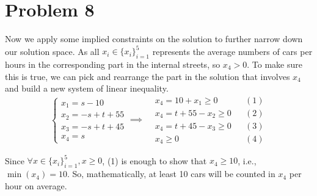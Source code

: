\documentclass[12pt,a4paper]{article}
\begin{document}
\section*{Problem 8}
\begin{solution}
Now we apply some implied constraints on the solution to further narrow down our solution space. As all $x_i \in \{x_i\}_{i=1}^5$ represents the average numbers of cars per hours in the corresponding part in the internal streets, so $x_4>0$. To make sure this is true, we can pick and rearrange the part in the solution that involves $x_4$ and build a new system of linear inequality.
\[
\begin{cases}
x_1 = s - 10 \\
x_2 = -s + t + 55 \\
x_3 = -s + t + 45 \\
x_4 = s
\end{cases}
\implies
\begin{aligned}
    &x_4 = 10 +x_1 \geq 0 && (1)\\
    &x_4 = t+55-x_2 \geq 0 && (2)\\
    &x_4 = t + 45 -x_3 \geq 0 && (3)\\
    &x_4 \geq 0 && (4)
\end{aligned}
\]

Since $\forall x\in \{x_i\}_{i=1}^5, x \geq 0$, (1) is enough to show that $x_4 \geq 10$, i.e., $\min(x_4)=10$. So, mathematically, at least 10 cars will be counted in $x_4$ per hour on average.

\end{solution}
\end{document}
